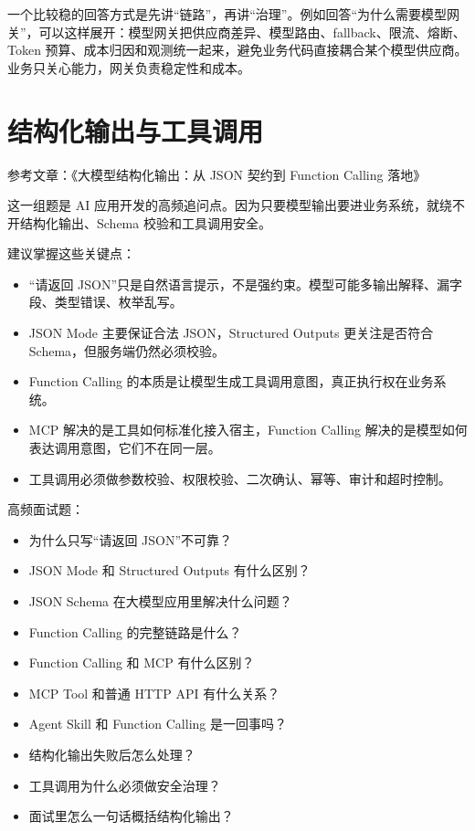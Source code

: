 \documentclass[10pt,a4paper]{ctexart}
\begin{document}
一个比较稳的回答方式是先讲“链路”，再讲“治理”。例如回答“为什么需要模型网关”，可以这样展开：模型网关把供应商差异、模型路由、fallback、限流、熔断、Token 预算、成本归因和观测统一起来，避免业务代码直接耦合某个模型供应商。业务只关心能力，网关负责稳定性和成本。



\section{结构化输出与工具调用}


参考文章：《大模型结构化输出：从 JSON 契约到 Function Calling 落地》



这一组题是 AI 应用开发的高频追问点。因为只要模型输出要进业务系统，就绕不开结构化输出、Schema 校验和工具调用安全。



建议掌握这些关键点：


\begin{itemize}[itemsep=2pt, topsep=4pt]
  \item “请返回 JSON”只是自然语言提示，不是强约束。模型可能多输出解释、漏字段、类型错误、枚举乱写。
  \item JSON Mode 主要保证合法 JSON，Structured Outputs 更关注是否符合 Schema，但服务端仍然必须校验。
  \item Function Calling 的本质是让模型生成工具调用意图，真正执行权在业务系统。
  \item MCP 解决的是工具如何标准化接入宿主，Function Calling 解决的是模型如何表达调用意图，它们不在同一层。
  \item 工具调用必须做参数校验、权限校验、二次确认、幂等、审计和超时控制。
\end{itemize}


高频面试题：


\begin{itemize}[itemsep=2pt, topsep=4pt]
  \item 为什么只写“请返回 JSON”不可靠？
  \item JSON Mode 和 Structured Outputs 有什么区别？
  \item JSON Schema 在大模型应用里解决什么问题？
  \item Function Calling 的完整链路是什么？
  \item Function Calling 和 MCP 有什么区别？
  \item MCP Tool 和普通 HTTP API 有什么关系？
  \item Agent Skill 和 Function Calling 是一回事吗？
  \item 结构化输出失败后怎么处理？
  \item 工具调用为什么必须做安全治理？
  \item 面试里怎么一句话概括结构化输出？
\end{itemize}
\end{document}
